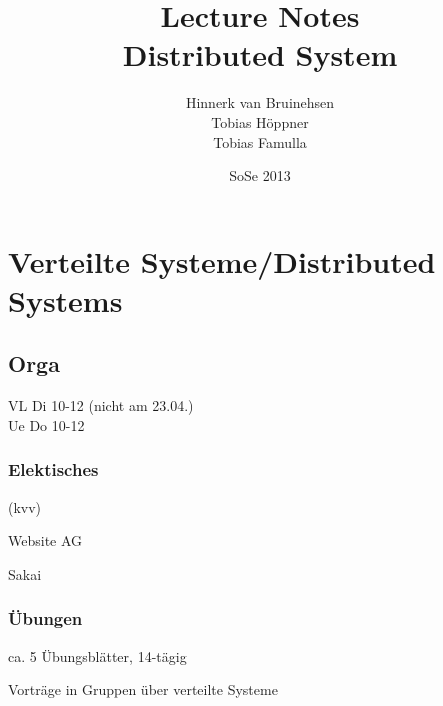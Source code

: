 \documentclass[ngerman,a4paper]{report}
\author{Hinnerk van Bruinehsen\\Tobias Höppner\\Tobias Famulla}
\title{Lecture Notes\\\Huge{Distributed System}}
\date{SoSe 2013}
\begin{document}
\maketitle
\tableofcontents

\chapter{Verteilte Systeme/Distributed Systems}
\section{Orga}
VL Di 10-12 (nicht am 23.04.)\\
Ue Do 10-12\\

\subsection{Elektisches}
\begin{compactitem}
\item (kvv)
\item Website AG
\item Sakai
\end{compactitem}

\subsection{Übungen}

\begin{compactitem}
\item ca. 5 Übungsblätter, 14-tägig
\item Vorträge in Gruppen über \glqq verteilte Systeme\grqq
\end{compactitem}
\end{document}
